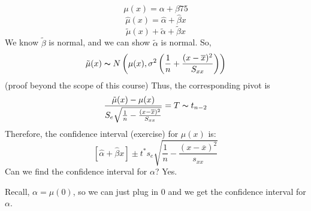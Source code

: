 \[ \mu(x)=\alpha+\beta 75 \]
\[ \hat{\mu}(x)=\hat{\alpha}+\hat{\beta}x \]
\[ \tilde{\mu}(x)+\tilde{\alpha}+\tilde{\beta}x \]
We know $ \tilde{\beta} $ is normal, and we can show $ \tilde{\alpha} $ is normal.
So,
\[ \tilde{\mu}(x) \thicksim N \left( \mu(x),\sigma^2
    \left( \frac{1}{n} +\frac{(x-\overline{x})^2}{S_{xx}} \right) \right) \]
(proof beyond the scope of this course)
Thus, the corresponding pivot is
\[ \frac{\tilde{\mu}(x)-\mu(x)}{S_{e}\sqrt{\frac{1}{n}-\frac{(x-\overline{x})^2}{S_{xx}}}}
    = T \thicksim t_{n-2} \]
Therefore, the confidence interval (exercise) for $ \mu(x) $ is:
\[ \left[ \hat{\alpha}+\hat{\beta}x \right]
    \pm
    t^* s_e \sqrt{\frac{1}{n}-\frac{(x-\overline{x})^2}{s_{xx}}} \]
Can we find the confidence interval for $ \alpha $? Yes.

Recall, $ \alpha=\mu(0) $, so we can just plug in $ 0 $ and we get the confidence
interval for $ \alpha $.
